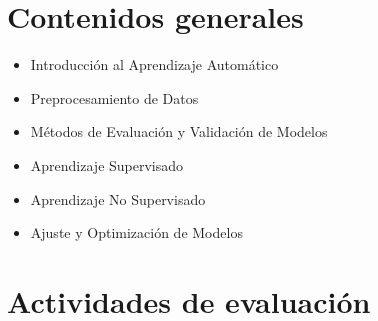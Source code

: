 \documentclass[a4,11pt]{aleph-notas}
\begin{document}
\section{Contenidos generales}

\begin{itemize}
\item
    Introducción al Aprendizaje Automático
\item
    Preprocesamiento de Datos
\item
    Métodos de Evaluación y Validación de Modelos
\item
    Aprendizaje Supervisado
\item
    Aprendizaje No Supervisado
\item
    Ajuste y Optimización de Modelos
\end{itemize}

\section{Actividades de evaluación}
\end{document}
